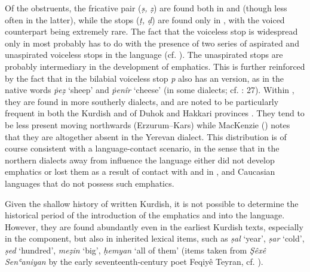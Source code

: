 \documentclass[output=paper]{langsci/langscibook}
\begin{document}
Of the  obstruents, the fricative pair (\textit{ṣ,} \textit{ẓ}) are found both in  and  (though less often in the latter), while the stops (\textit{ṭ,} \textit{ḍ}) are found only in , with the voiced counterpart being extremely rare. The fact that the voiceless  stop is widespread only in  most probably has to do with the presence of two series of aspirated and unaspirated voiceless stops in the language (cf. ). The unaspirated stops are probably intermediary in the development of emphatics. This is further reinforced by the fact that in  the bilabial voiceless stop \textit{p} also has an  version, as in the native words \textit{ṗeẓ} ‘sheep’ and \textit{ṗenîr} ‘cheese’ (in some dialects; cf. \citealt{Kahn1976}: 27). Within , they are found in more southerly dialects, and are noted to be particularly frequent in both the Kurdish and  of Duhok and Hakkari provinces  \citep[329]{Blau1989}. They tend to be less present moving northwards (Erzurum–Kars) while MacKenzie (\citeyear[43]{MacKenzie1961}) notes that they are altogether absent in the Yerevan dialect. This distribution is of course consistent with a language-contact scenario, in the sense that in the northern dialects away from  influence the language either did not develop emphatics or lost them as a result of contact with and  in ,  and Caucasian languages that do not possess such emphatics.   

Given the shallow history of written Kurdish, it is not possible to determine the historical period of the introduction of the emphatics and  into the language. However, they are found abundantly even in the earliest Kurdish texts, especially in the  component, but also in inherited lexical items, such as \textit{ṣal} ‘year’, \textit{ṣar} ‘cold’, \textit{ṣed} ‘hundred’, \textit{meẓin} ‘big’, \textit{ḥemyan} ‘all of them’ (items taken from \textit{Şêxê} \textit{Senʿaniyan} by the early seventeenth-century poet Feqiyê Teyran, cf. \citealt{Teyran2011}). 
\end{document}
